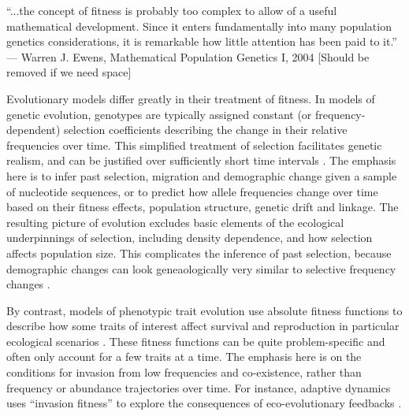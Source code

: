 \documentclass[11pt]{article}
\begin{document}
\newpage{}


``...the concept of fitness is probably too complex to allow of a useful mathematical development. Since it enters fundamentally into many population genetics considerations, it is remarkable how little attention has been paid to it.'' --- Warren J. Ewens, Mathematical Population Genetics I, 2004 [Should be removed if we need space]

Evolutionary models differ greatly in their treatment of fitness. In models of genetic evolution, genotypes are typically assigned constant (or frequency-dependent) selection coefficients describing the change in their relative frequencies over time. This simplified treatment of selection facilitates genetic realism, and can be justified over sufficiently short time intervals \citep[p. 276]{ewens_2004}. The emphasis here is to infer past selection, migration and demographic change given a sample of nucleotide sequences, or to predict how allele frequencies change over time based on their fitness effects, population structure, genetic drift and linkage. The resulting picture of evolution excludes basic elements of the ecological underpinnings of selection, including density dependence, and how selection affects population size. This complicates the inference of past selection, because demographic changes can look geneaologically very similar to selective frequency changes \citep{barton_1998}. 


By contrast, models of phenotypic trait evolution use absolute fitness functions to describe how some traits of interest affect survival and reproduction in particular ecological scenarios \citep{metz_1992,diekmann_2004}. These fitness functions can be quite problem-specific and often only account for a few traits at a time. The emphasis here is on the conditions for invasion from low frequencies and co-existence, rather than frequency or abundance trajectories over time. For instance, adaptive dynamics uses ``invasion fitness'' to explore the consequences of eco-evolutionary feedbacks \citep{diekmann_2004}.
\end{document}
